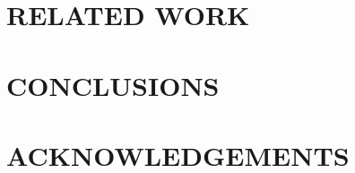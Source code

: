 \documentclass{sigchi}
\begin{document}







\section{RELATED WORK}
\label{relatedwork}



\section{CONCLUSIONS}
\label{conclusions}







\section{ACKNOWLEDGEMENTS}




\balance


\end{document}

